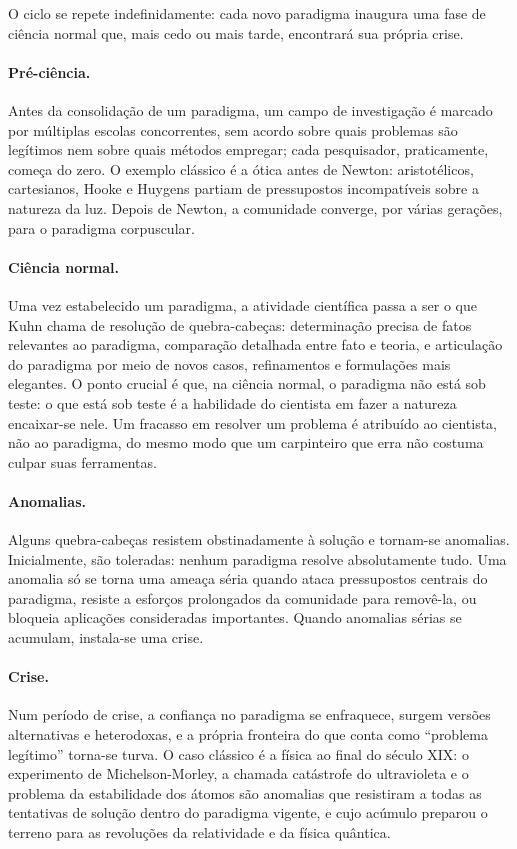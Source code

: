 \documentclass[9pt,a4paper]{extarticle}
\newcommand{\impt}[1]{\textcolor{important}{#1}}
\newcommand{\ntc}[1]{\textcolor{notice}{#1}}
\theoremstyle{definition}
\begin{document}
O ciclo se repete indefinidamente: cada novo paradigma inaugura uma fase de ciência normal que, mais cedo ou mais tarde, encontrará sua própria crise.

\paragraph{Pré-ciência.}
Antes da consolidação de um paradigma, um campo de investigação é marcado por múltiplas escolas concorrentes, sem acordo sobre quais problemas são legítimos nem sobre quais métodos empregar; cada pesquisador, praticamente, começa do zero. O exemplo clássico é a ótica antes de Newton: aristotélicos, cartesianos, Hooke e Huygens partiam de pressupostos incompatíveis sobre a natureza da luz. Depois de Newton, a comunidade converge, por várias gerações, para o paradigma corpuscular.

\paragraph{Ciência normal.}
Uma vez estabelecido um paradigma, a atividade científica passa a ser o que Kuhn chama de \impt{resolução de quebra-cabeças}: determinação precisa de fatos relevantes ao paradigma, comparação detalhada entre fato e teoria, e articulação do paradigma por meio de novos casos, refinamentos e formulações mais elegantes. O ponto crucial é que, na ciência normal, o \ntc{paradigma não está sob teste}: o que está sob teste é a habilidade do cientista em fazer a natureza encaixar-se nele. Um fracasso em resolver um problema é atribuído ao cientista, não ao paradigma, do mesmo modo que um carpinteiro que erra não costuma culpar suas ferramentas.

\paragraph{Anomalias.}
Alguns quebra-cabeças resistem obstinadamente à solução e tornam-se \impt{anomalias}. Inicialmente, são toleradas: nenhum paradigma resolve absolutamente tudo. Uma anomalia só se torna uma ameaça séria quando ataca pressupostos centrais do paradigma, resiste a esforços prolongados da comunidade para removê-la, ou bloqueia aplicações consideradas importantes. Quando anomalias sérias se acumulam, instala-se uma \impt{crise}.

\paragraph{Crise.}
Num período de crise, a confiança no paradigma se enfraquece, surgem versões alternativas e heterodoxas, e a própria fronteira do que conta como \enquote{problema legítimo} torna-se turva. O caso clássico é a física ao final do século XIX: o experimento de Michelson-Morley, a chamada catástrofe do ultravioleta e o problema da estabilidade dos átomos são anomalias que resistiram a todas as tentativas de solução dentro do paradigma vigente, e cujo acúmulo preparou o terreno para as revoluções da relatividade e da física quântica.
\end{document}
